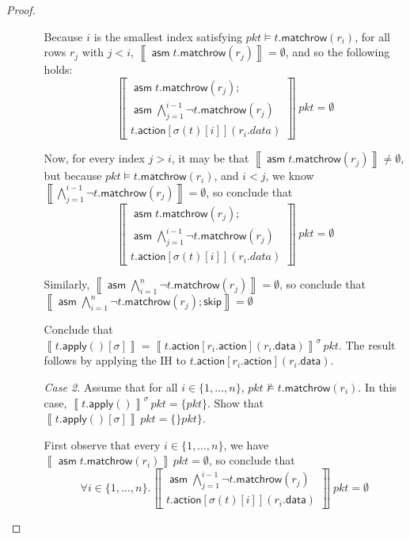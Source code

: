 \documentclass{article}
\newcommand{\pkt}{\mathit{pkt}}
\newcommand{\denote}[1]{\left\llbracket#1\right\rrbracket}
\newcommand{\action}{\mathsf{action}}
\newcommand{\data}{\mathsf{data}}
\newcommand{\assume}{\mathop{\mathsf{asm}}}
\newcommand{\apply}{\mathsf{apply}}
\newcommand{\SKIP}{\mathsf{skip}}
\newcommand{\matchrow}{\mathsf{matchrow}}
\begin{document}
\begin{proof}
\begin{enumerate}[align=left]
\begin{enumerate}
        Because $i$ is the smallest index satisfying $\pkt \models
        t.\matchrow(r_i)$, for all rows $r_j$ with $j < i$, $\denote{\assume
          t.\matchrow(r_j)} = \emptyset$, and so the following holds: \[
          \denote{
          \begin{array}{l}
            \assume t.\matchrow(r_j);\\
            \assume \bigwedge_{j=1}^{i-1}\neg t.\matchrow(r_j)\\
            t.\action[\sigma(t)[i]](r_i.data)
        \end{array}}\,\pkt = \emptyset
          \]

        Now, for every index $j > i$, it may be that $\denote{\assume
          t.\matchrow(r_j)} \neq \emptyset$, but because $\pkt \models
        t.\matchrow(r_i)$, and $i < j$, we know $\denote{\bigwedge_{j=1}^{i-1}
          \neg t.\matchrow(r_j)} = \emptyset$, so conclude that \[
          \denote{
          \begin{array}{l}
            \assume t.\matchrow(r_j);\\
            \assume \bigwedge_{j=1}^{i-1}\neg t.\matchrow(r_j)\\
            t.\action[\sigma(t)[i]](r_i.data)
        \end{array}}\,\pkt = \emptyset
          \]

        Similarly, $\denote{\assume \bigwedge_{i=1}^{n} \neg t.\matchrow(r_j)} =
        \emptyset$, so conclude that $\denote{\assume \bigwedge_{i=1}^{n} \neg
          t.\matchrow(r_j);\SKIP} = \emptyset$


        Conclude that $\denote{t.\apply()[\sigma]} =
        \denote{t.\action[r_i.\action](r_i.\data)}^\sigma\,\pkt$. The result
        follows by applying the IH to $t.\action[r_i.\action](r_i.\data)$.

        \item[\textit{Case 2.}] Assume that for all $i \in \{1, \ldots, n\}$,
          $\pkt \not\models t.\matchrow(r_i)$. In this case,
          $\denote{t.\apply()}^\sigma\,\pkt = \{\pkt\}$. Show that $\denote{t.\apply()[\sigma]}\,\pkt = \{\}\pkt\}$.

          First observe that every $i \in \{1, \ldots, n\}$, we have
          $\denote{\assume t.\matchrow(r_i)}\,\pkt = \emptyset$, so conclude
          that
          \[ \forall i \in \{1,\ldots,n\}.\denote{
          \begin{array}{l}
            \assume \bigwedge_{j=1}^{i-1}\neg t.\matchrow(r_j)\\
            t.\action[\sigma(t)[i]](r_i.\data)
        \end{array}}\,\pkt = \emptyset
          \]


\end{enumerate}
\end{enumerate}
\end{proof}
\end{document}
